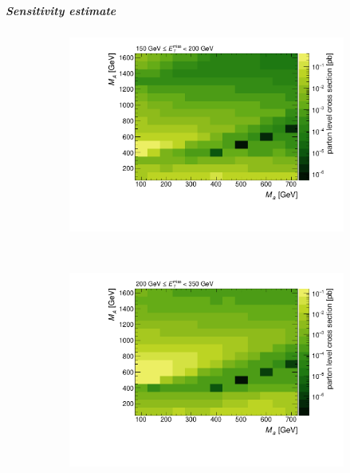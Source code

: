 \subparagraph{Sensitivity estimate}
\begin{figure}[tbp]
\centering
\begin{subfigure}{0.48\textwidth}
\includegraphics[width = \textwidth]{texinputs/04_grid/figures/monoHbb_parton_level_cross_section_bin_1_ma_vs_mA_lin.pdf}
\end{subfigure}
~
\begin{subfigure}{0.48\textwidth}
\includegraphics[width = \textwidth]{texinputs/04_grid/figures/monoHbb_parton_level_cross_section_bin_2_ma_vs_mA_lin.pdf}
\end{subfigure}
\\
\centering
\begin{subfigure}{0.48\textwidth}

\end{subfigure}
\end{figure}
